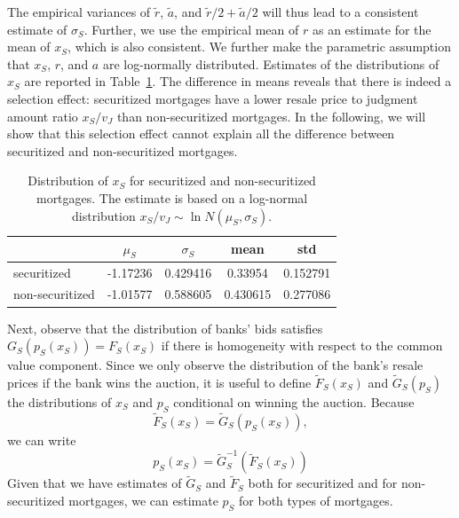 \documentclass[11pt,twopage]{article}
\begin{document}
The empirical variances of $\tilde r$, $\tilde a$, and
$\tilde r/2+\tilde a/2$ will thus lead to a consistent estimate of $\sigma_S$. Further,
we use the empirical mean of $r$ as an estimate for the mean of
$x_S$, which is also consistent. We further make the parametric assumption that $x_S$, $r$, and
$a$ are log-normally distributed. Estimates of the distributions of $x_S$ are reported in Table~\ref{tab:xs}. The difference in means reveals that there is indeed a selection effect: securitized mortgages have a lower resale price to judgment amount ratio $x_S/v_J$ than non-securitized mortgages. In the following, we will show that this selection effect cannot explain all the difference between securitized and non-securitized mortgages. 

\begin{table}
	\begin{center}
		\begin{tabular}{l|cc||cc}
			& $\mu_S$ & $\sigma_S$ & mean & std \\
			\hline
			securitized & -1.17236 & 0.429416 & 0.33954 & 0.152791 \\
			non-securitized & -1.01577 & 0.588605 & 0.430615 & 0.277086
		\end{tabular}
		\caption{Distribution of $x_S$ for securitized and non-securitized mortgages. The estimate is based on a log-normal distribution $x_S/v_J\sim \ln N(\mu_S,\sigma_S)$.\label{tab:xs}}
	\end{center}
\end{table}


Next, observe that the distribution of banks' bids satisfies
$G_S(p_S(x_S))=F_S(x_S)$ if there is homogeneity with respect to the
common value component. Since we only observe the distribution of the
bank's resale prices if the bank wins the auction, it is useful to
define $\tilde F_S(x_S)$ and $\tilde
G_S(p_S)$ the distributions of $x_S$ and $p_S$ conditional on winning the auction.
Because \[ \tilde F_S(x_S) =\tilde G_S(p_S(x_S)), \]we can write
\[
p_S(x_S) = \tilde G_S^{-1}(\tilde F_S(x_S))
\]
Given that we have estimates of $\tilde G_S$ and $\tilde F_S$ both for
securitized and for non-securitized mortgages, we can estimate $p_S$
for both types of mortgages.

\end{document}
